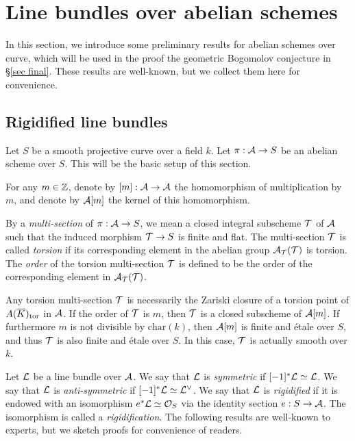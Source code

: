 \documentclass[12pt]{amsart}
\begin{document}
\section{Line bundles over abelian schemes} \label{sec line bundle}

In this section, we introduce some preliminary results for abelian schemes over curve, which will be used in the proof the geometric Bogomolov conjecture in \S\ref{sec final}. These results are well-known, but we collect them here for convenience.

\subsection{Rigidified line bundles}
Let $S$ be a smooth projective curve over a field $k$. 
Let $\pi:{\mathcal A}\to S$ be an abelian scheme over $S$.
This will be the basic setup of this section.

For any $m\in{\mathbb Z}$, denote by $[m]:{\mathcal A}\to {\mathcal A}$ the homomorphism of multiplication by $m$, and denote by ${\mathcal A}[m]$ the kernel of this homomorphism. 

By a \emph{multi-section} of $\pi:{\mathcal A}\to S$, we mean a closed integral subscheme ${\mathcal T}$ of ${\mathcal A}$ such that the induced morphism ${\mathcal T}\to S$ is finite and flat. 
The multi-section ${\mathcal T}$ is called \emph{torsion} if its corresponding element in the abelian group ${\mathcal A}_{\mathcal T}({\mathcal T})$ is torsion. 
The \emph{order} of the torsion multi-section ${\mathcal T}$ is defined to be the order of the corresponding element in ${\mathcal A}_{\mathcal T}({\mathcal T})$.

Any torsion multi-section ${\mathcal T}$ is necessarily the Zariski closure of a torsion point of $A({\overline{K}})_{\mathrm{tor}}$ in ${\mathcal A}$. 
If the order of ${\mathcal T}$ is $m$, then ${\mathcal T}$ is a closed subscheme of ${\mathcal A}[m]$. 
If furthermore $m$ is not divisible by $\mathrm{char}(k)$, then ${\mathcal A}[m]$ is finite and \'etale over $S$, and thus ${\mathcal T}$ is also finite and \'etale over $S$. 
In this case, ${\mathcal T}$ is actually smooth over $k$.

Let ${\mathcal L}$ be a line bundle over ${\mathcal A}$. 
We say that ${\mathcal L}$ is \emph{symmetric} if $[-1]^*{\mathcal L}\simeq {\mathcal L}$. 
We say that ${\mathcal L}$ is \emph{anti-symmetric} if $[-1]^*{\mathcal L}\simeq {\mathcal L}^\vee$. 
We say that ${\mathcal L}$ is \emph{rigidified} if it is endowed with an isomorphism $e^*{\mathcal L}\simeq {\mathcal O}_S$ via the identity section $e:S\to {\mathcal A}$. The isomorphism is called a \emph{rigidification}.
The following results are well-known to experts, but we sketch proofs for convenience of readers.
\end{document}
